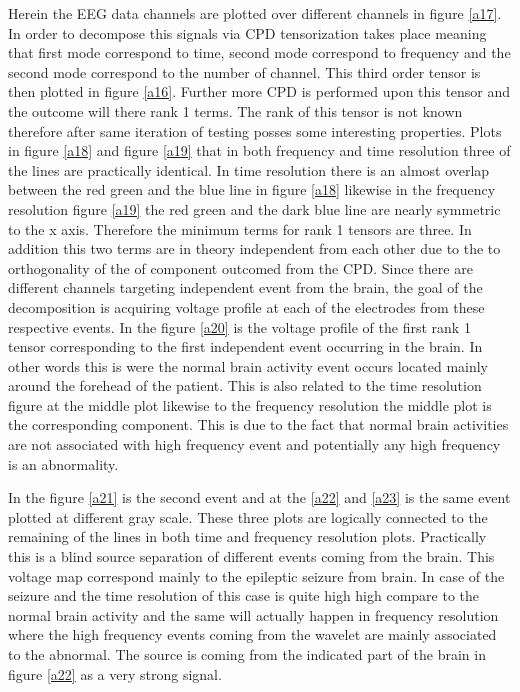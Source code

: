 Herein the EEG data channels are plotted over different channels in figure \ref{a17}. In order to decompose this signals via CPD tensorization takes place meaning that first mode correspond to time, second mode correspond to frequency and the second mode correspond to the number of channel. This third order tensor is then plotted in figure \ref{a16}. Further more CPD is performed upon this tensor and the outcome will there rank 1 terms. The rank of this tensor is not known therefore after same iteration  of testing posses some interesting properties. Plots in figure \ref{a18} and figure \ref{a19} that in both frequency and time resolution three of the lines are practically identical. In time resolution there is an almost overlap between the red green and the blue line in figure \ref{a18} likewise in the frequency resolution figure \ref{a19} the red green and the dark blue line are nearly symmetric to the x axis. Therefore the minimum terms for rank 1 tensors are three. In addition this two terms are in theory independent from each other due to the to orthogonality of the of component outcomed from the CPD. Since there are different channels targeting independent event from the brain, the goal of the decomposition is acquiring voltage profile at each of the electrodes from these respective events. In the figure \ref{a20} is the voltage profile of the first rank 1 tensor corresponding to the first independent event occurring in the brain. In other words this is were the normal brain activity event occurs located mainly around the forehead of the patient. This is also related to the time resolution figure at the middle plot likewise to the frequency resolution the middle plot is the corresponding component. This is due to the fact that normal brain activities are not associated with high frequency event and potentially any high frequency is an abnormality. 

In the figure \ref{a21} is the second event and at the \ref{a22} and \ref{a23} is the same event plotted at different gray scale. These three plots are logically connected to the remaining of the lines in both time and frequency resolution plots. Practically this is a blind source separation of different events coming from the brain. This voltage map correspond mainly to the epileptic seizure from brain. In case of the seizure and the time resolution of this case is quite high high compare to the normal brain activity and the same will actually happen in frequency resolution where the high frequency events coming from the wavelet are mainly associated to the abnormal. The source is coming from the  indicated part of the brain in figure \ref{a22} as a very strong signal. 

